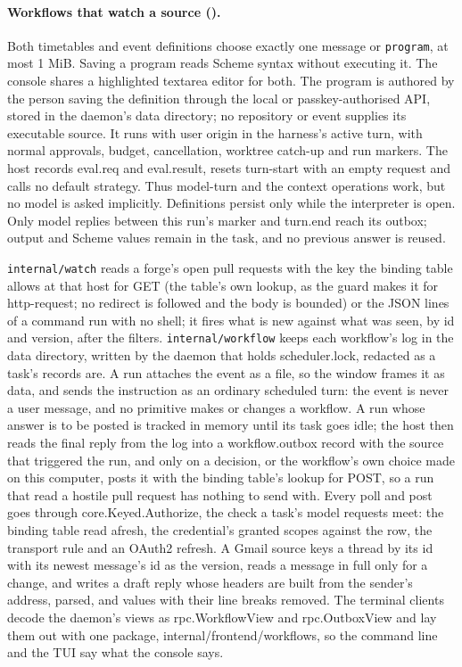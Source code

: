 \paragraph{Workflows that watch a source ().}
Both timetables and event definitions choose exactly one message or
\texttt{program}, at most 1 MiB. Saving a program reads Scheme syntax without
executing it. The console shares a highlighted textarea editor for both.
The program is authored by the person saving the definition through the
local or passkey-authorised API, stored in the daemon's data directory;
no repository or event supplies its executable source. It runs with user
origin in the harness's active turn, with normal approvals, budget,
cancellation, worktree catch-up and run markers. The host records eval.req
and eval.result, resets turn-start with an empty request and calls no default
strategy. Thus model-turn and the context operations work, but no model is
asked implicitly. Definitions persist only while the interpreter is open.
Only model replies between this run's marker and turn.end reach its outbox;
output and Scheme values remain in the task, and no previous answer is reused.

\texttt{internal/watch} reads a forge's open pull requests with the key the
binding table allows at that host for GET (the table's own lookup, as the
guard makes it for http-request; no redirect is followed and the body is
bounded) or the JSON lines of a command run with no shell; it fires what is
new against what was seen, by id and version, after the filters.
\texttt{internal/workflow} keeps each workflow's log in the data directory,
written by the daemon that holds scheduler.lock, redacted as a task's records
are. A run attaches the event as a file, so the window frames it as data, and
sends the instruction as an ordinary scheduled turn: the event is never a
user message, and no primitive makes or changes a workflow. A run whose
answer is to be posted is tracked in memory until its task goes idle; the
host then reads the final reply from the log into a workflow.outbox record
with the source that triggered the run,
and only on a decision, or the workflow's own choice made on this computer,
posts it with the binding table's lookup for POST, so a run that read a
hostile pull request has nothing to send with. Every poll and post goes
through core.Keyed.Authorize, the check a task's model requests meet: the
binding table read afresh, the credential's granted scopes against the row, the
transport rule and an OAuth2 refresh. A Gmail source keys a thread by its id
with its newest message's id as the version, reads a message in full only for
a change, and writes a draft reply whose headers are built from the sender's
address, parsed, and values with their line breaks removed. The terminal
clients decode the daemon's views as rpc.WorkflowView and rpc.OutboxView and
lay them out with one package, internal/frontend/workflows, so the command line
and the TUI say what the console says.


